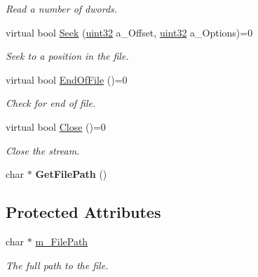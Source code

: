 \begin{DoxyCompactItemize}
\begin{DoxyCompactList}\small\item\em Read a number of dwords. \item\end{DoxyCompactList}\item 
virtual bool \hyperlink{classtil_1_1_file_stream_a29dfe625c988d68478ac6418478f7ea1}{Seek} (\hyperlink{namespacetil_a20db61688ed403d11f057a508d87e54c}{uint32} a\_\-Offset, \hyperlink{namespacetil_a20db61688ed403d11f057a508d87e54c}{uint32} a\_\-Options)=0
\begin{DoxyCompactList}\small\item\em Seek to a position in the file. \item\end{DoxyCompactList}\item 
virtual bool \hyperlink{classtil_1_1_file_stream_a693c2379367badd18d65d7f83512f595}{EndOfFile} ()=0
\begin{DoxyCompactList}\small\item\em Check for end of file. \item\end{DoxyCompactList}\item 
virtual bool \hyperlink{classtil_1_1_file_stream_a247dffc5fa0875cbafb48c63baa03493}{Close} ()=0
\begin{DoxyCompactList}\small\item\em Close the stream. \item\end{DoxyCompactList}\item 
\hypertarget{classtil_1_1_file_stream_a11c2696a386b75cbcb3194a944debc78}{
char $\ast$ {\bfseries GetFilePath} ()}
\label{classtil_1_1_file_stream_a11c2696a386b75cbcb3194a944debc78}

\end{DoxyCompactItemize}
\subsection*{Protected Attributes}
\begin{DoxyCompactItemize}
\item 
\hypertarget{classtil_1_1_file_stream_ae96d56b6be09292181e4a6924e3fa2f1}{
char $\ast$ \hyperlink{classtil_1_1_file_stream_ae96d56b6be09292181e4a6924e3fa2f1}{m\_\-FilePath}}
\label{classtil_1_1_file_stream_ae96d56b6be09292181e4a6924e3fa2f1}

\begin{DoxyCompactList}\small\item\em The full path to the file. \item\end{DoxyCompactList}\end{DoxyCompactItemize}


